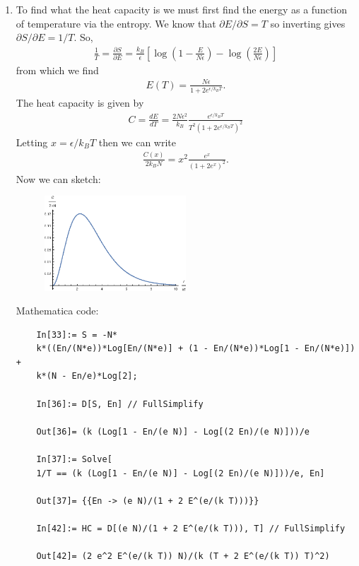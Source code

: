 \documentclass{article}
\theoremstyle{definition}
\newcommand{\p}{\partial}
\newcommand{\f}[2]{\frac{#1}{#2}}
\newcommand{\lp}{\left(}
\newcommand{\rp}{\right)}
\newcommand{\lb}{\left[}
\newcommand{\rb}{\right]}
\begin{document}
\begin{enumerate}[label=(\alph*)]
	\item To find what the heat capacity is we must first find the energy as a function of temperature via the entropy. We know that $\p E/ \p S = T$ so inverting gives $\p S/\p E = 1/T$. So, 
	\begin{align*}
	\f{1}{T} = \f{\p S}{\p E} = \f{k_B}{\epsilon}\lb \log \lp 1  - \f{E}{N\epsilon}  \rp - \log \lp \f{2 E}{N\epsilon} \rp  \rb
	\end{align*}
	from which we find 
	\begin{align*}
	E(T) = \f{N\epsilon}{1 + 2e^{\epsilon/k_BT}}.
	\end{align*}
	The heat capacity is given by 
	\begin{align*}
	C = \f{dE}{dT} = \boxed{\f{2N\epsilon^2}{k_B}\f{e^{\epsilon/k_BT}}{T^2\lp 1 +  2 e^{\epsilon/k_BT} \rp^2}}
	\end{align*}
	Letting $x = \epsilon/k_BT$ then we can write
	\begin{align*}
	\f{C(x)}{2k_BN} = x^2\f{e^x}{(1+2e^x)^2}.
	\end{align*}
	Now we can sketch:
	\begin{figure}[!htb]
		\centering
		\includegraphics[width=0.5\textwidth]{problem3.eps}
	\end{figure}



	Mathematica code:
	\begin{lstlisting}
	In[33]:= S = -N*
	k*((En/(N*e))*Log[En/(N*e)] + (1 - En/(N*e))*Log[1 - En/(N*e)]) + 
	k*(N - En/e)*Log[2];
	
	In[36]:= D[S, En] // FullSimplify
	
	Out[36]= (k (Log[1 - En/(e N)] - Log[(2 En)/(e N)]))/e
	
	In[37]:= Solve[
	1/T == (k (Log[1 - En/(e N)] - Log[(2 En)/(e N)]))/e, En]
	
	Out[37]= {{En -> (e N)/(1 + 2 E^(e/(k T)))}}
	
	In[42]:= HC = D[(e N)/(1 + 2 E^(e/(k T))), T] // FullSimplify
	
	Out[42]= (2 e^2 E^(e/(k T)) N)/(k (T + 2 E^(e/(k T)) T)^2)
	

\end{lstlisting}
\end{enumerate}
\end{document}
